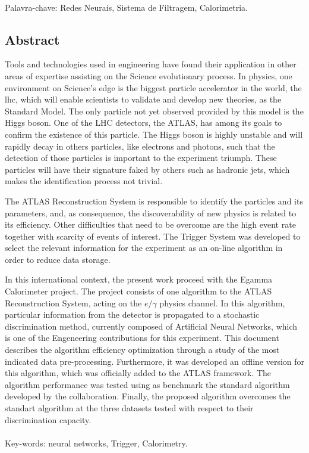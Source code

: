 \paragraph*{}

\noindent Palavra-chave: Redes Neurais, Sistema de Filtragem, Calorimetria.

\vfill

\clearpage

\vfill
\begin{center}
\section*{Abstract\label{Abstract}}
\end{center}

Tools and technologies used in engineering have found their
application in other areas of expertise assisting on the Science evolutionary
process. In physics, one environment on Science's edge is the biggest
particle accelerator in the world, the \acrshort{lhc}, which will enable
scientists to validate and develop new theories, as the Standard Model. The only
particle not yet observed provided by this model is the Higgs boson. One of the LHC 
detectors, the ATLAS, has among its goals to confirm the existence
of this particle. The Higgs boson is highly unstable and will rapidly
decay in others particles, like electrons and photons, such that the detection
of those particles is important to the experiment triumph. These particles will 
have their signature faked by others such as hadronic jets, 
which makes the identification process not trivial.

The ATLAS Reconstruction System is responsible to identify the particles and its
parameters, and, as consequence, the discoverability of new physics is related to its
efficiency. Other difficulties that need to be overcome are the high event rate together
with scarcity of events of interest. The Trigger System was developed to
select the relevant information for the experiment as an on-line algorithm in
order to reduce data storage.

In this international context, the present work proceed with the Egamma
Calorimeter project. The project consists of one algorithm to the 
ATLAS Reconstruction System, acting on the $e/\gamma$ physics channel. In this algorithm,
particular information from the detector is propagated to a stochastic
discrimination method, currently composed of Artificial Neural Networks, which
is one of the Engeneering contributions for this experiment.
This document describes the algorithm efficiency optimization through a study
of the most indicated data pre-processing. Furthermore, it was developed an
offline version for this algorithm, which was officially added to the ATLAS framework. 
The algorithm performance was tested using as benchmark the
standard algorithm developed by the collaboration. Finally, the proposed
algorithm overcomes the standart algorithm at the three datasets tested with
respect to their discrimination capacity.

\paragraph*{}

\noindent Key-words: neural networks, Trigger, Calorimetry.

\vfill
\clearpage
